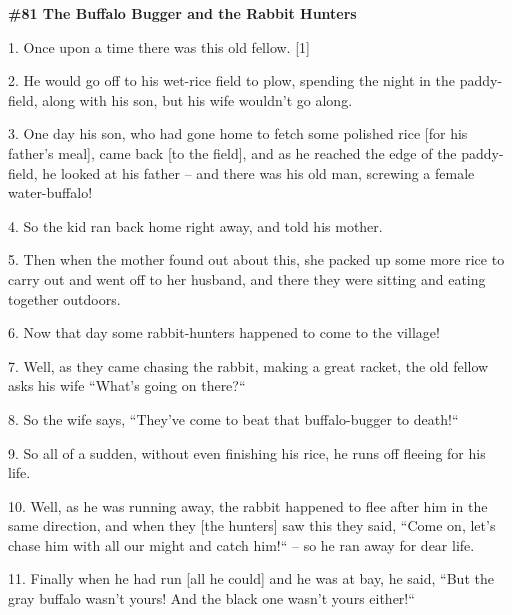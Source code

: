 
\textbf{\#81 The Buffalo Bugger and the Rabbit Hunters}

1. Once upon a time there was this old fellow. [1]

2.  He would go off to his wet-rice field to plow, spending the night in the paddy-field,
along with his son, but his wife wouldn't go along.

3. One day his son, who had gone home to fetch some polished rice [for his father's
meal], came back [to the field], and as he reached the edge of the  paddy-field,
he looked at his father -- and there was his old man, screwing a female water-buffalo!

4. So the kid ran back home right away, and told his mother.

5. Then when the mother found out about this, she packed up some more rice to carry
out and went off to her husband, and there they were sitting and eating together
outdoors.

6. Now that day some rabbit-hunters happened to come to the village!

7. Well, as they came chasing the rabbit, making a great racket, the old fellow
asks his wife ``What's going on there?``

8. So the wife says, ``They've come to beat that buffalo-bugger to death!``

9. So all of a sudden, without even finishing his rice, he runs off fleeing for
his life.

10. Well, as he was running away, the rabbit happened to flee after him in the
same direction, and when they [the hunters] saw this they  said, ``Come
on, let's chase him with all our might and catch him!`` -- so he ran away
for dear life.

11. Finally when he had run [all he could] and he was at bay, he said, ``But
the gray buffalo wasn't yours! And the black one wasn't yours either!``
